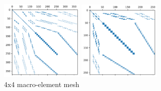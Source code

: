 \documentclass[a4paper]{article}
\begin{document}
\begin{center}
\includegraphics[width=4cm]{../results/spy/A_bef_topo6.pdf}
\includegraphics[width=4cm]{../results/spy/A_bef_topo7.pdf}\\
{\small 4x4 macro-element mesh}
\end{center}
\end{document}
